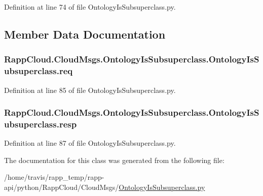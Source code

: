Definition at line 74 of file Ontology\-Is\-Subsuperclass.\-py.



\subsection{Member Data Documentation}
\hypertarget{classRappCloud_1_1CloudMsgs_1_1OntologyIsSubsuperclass_1_1OntologyIsSubsuperclass_a3ba977d885c6e4a0320e3f95450f883f}{
\subsubsection[{req}]{\setlength{\rightskip}{0pt plus 5cm}Rapp\-Cloud.\-Cloud\-Msgs.\-Ontology\-Is\-Subsuperclass.\-Ontology\-Is\-Subsuperclass.\-req}}\label{classRappCloud_1_1CloudMsgs_1_1OntologyIsSubsuperclass_1_1OntologyIsSubsuperclass_a3ba977d885c6e4a0320e3f95450f883f}


Definition at line 85 of file Ontology\-Is\-Subsuperclass.\-py.

\hypertarget{classRappCloud_1_1CloudMsgs_1_1OntologyIsSubsuperclass_1_1OntologyIsSubsuperclass_a72853b4ae58fb0757d71039f75ca49d5}{
\subsubsection[{resp}]{\setlength{\rightskip}{0pt plus 5cm}Rapp\-Cloud.\-Cloud\-Msgs.\-Ontology\-Is\-Subsuperclass.\-Ontology\-Is\-Subsuperclass.\-resp}}\label{classRappCloud_1_1CloudMsgs_1_1OntologyIsSubsuperclass_1_1OntologyIsSubsuperclass_a72853b4ae58fb0757d71039f75ca49d5}


Definition at line 87 of file Ontology\-Is\-Subsuperclass.\-py.



The documentation for this class was generated from the following file\-:\begin{DoxyCompactItemize}
\item 
/home/travis/rapp\-\_\-temp/rapp-\/api/python/\-Rapp\-Cloud/\-Cloud\-Msgs/\hyperlink{OntologyIsSubsuperclass_8py}{Ontology\-Is\-Subsuperclass.\-py}\end{DoxyCompactItemize}
